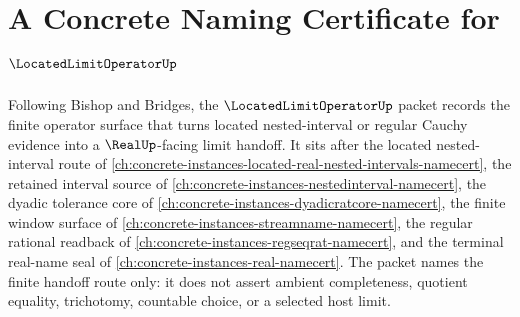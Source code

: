 \chapter{A Concrete Naming Certificate for $\LocatedLimitOperatorUp$}
\label{ch:concrete-instances-located-limit-operator-namecert}

Following Bishop and Bridges, the $\LocatedLimitOperatorUp$ packet records the finite operator surface that turns located nested-interval or regular Cauchy evidence into a $\RealUp$-facing limit handoff. It sits after the located nested-interval route of \autoref{ch:concrete-instances-located-real-nested-intervals-namecert}, the retained interval source of \autoref{ch:concrete-instances-nestedinterval-namecert}, the dyadic tolerance core of \autoref{ch:concrete-instances-dyadicratcore-namecert}, the finite window surface of \autoref{ch:concrete-instances-streamname-namecert}, the regular rational readback of \autoref{ch:concrete-instances-regseqrat-namecert}, and the terminal real-name seal of \autoref{ch:concrete-instances-real-namecert}. The packet names the finite handoff route only: it does not assert ambient completeness, quotient equality, trichotomy, countable choice, or a selected host limit.

